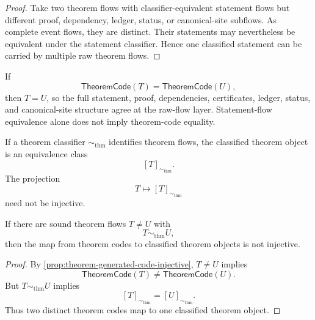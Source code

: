 \begin{proof}
Take two theorem flows with classifier-equivalent statement flows but different proof, dependency, ledger, status, or canonical-site subflows. As complete event flows, they are distinct. Their statements may nevertheless be equivalent under the statement classifier. Hence one classified statement can be carried by multiple raw theorem flows.
\end{proof}

\begin{corollary}
\label{cor:theorem-generated-code-stronger-than-statement-equivalence}
If
$$
  \mathsf{TheoremCode}(T)=\mathsf{TheoremCode}(U),
$$
then $T=U$, so the full statement, proof, dependencies, certificates, ledger, status, and canonical-site structure agree at the raw-flow layer. Statement-flow equivalence alone does not imply theorem-code equality.
\end{corollary}

\begin{definition}
\label{def:theorem-generated-classifier-quotient}
If a theorem classifier $\sim_{\mathrm{thm}}$ identifies theorem flows, the classified theorem object is an equivalence class
$$
  [T]_{\sim_{\mathrm{thm}}}.
$$
The projection
$$
  T \longmapsto [T]_{\sim_{\mathrm{thm}}}
$$
need not be injective.
\end{definition}

\begin{proposition}
\label{prop:theorem-generated-classified-not-code-bijective}
If there are sound theorem flows $T\neq U$ with
$$
  T\sim_{\mathrm{thm}} U,
$$
then the map from theorem codes to classified theorem objects is not injective.
\end{proposition}

\begin{proof}
By \autoref{prop:theorem-generated-code-injective}, $T\neq U$ implies
$$
  \mathsf{TheoremCode}(T)\neq\mathsf{TheoremCode}(U).
$$
But $T\sim_{\mathrm{thm}} U$ implies
$$
  [T]_{\sim_{\mathrm{thm}}}=[U]_{\sim_{\mathrm{thm}}}.
$$
Thus two distinct theorem codes map to one classified theorem object.
\end{proof}

